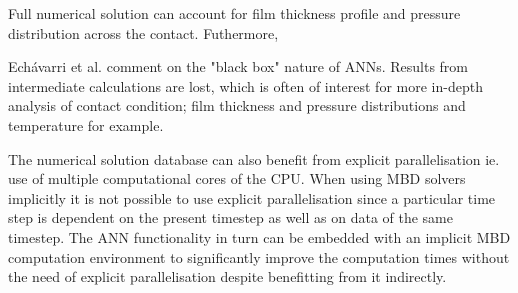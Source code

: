 Full numerical solution can account for film thickness profile and pressure distribution across the contact. Futhermore, 

Echávarri et al. \cite{EchavarriOtero2014} comment on the "black box" nature of ANNs. Results from intermediate calculations are lost, which is often of interest for more in-depth analysis of contact condition; film thickness and pressure distributions and temperature for example.  

The numerical solution database can also benefit from explicit parallelisation ie. use of multiple computational cores of the CPU. When using MBD solvers implicitly it is not possible to use explicit parallelisation since a particular time step is dependent on the present timestep as well as on data of the same timestep. The ANN functionality in turn can be embedded with an implicit MBD computation environment to significantly improve the computation times without the need of explicit parallelisation despite benefitting from it indirectly. 

